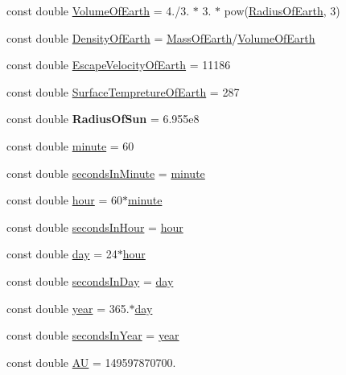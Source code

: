 \begin{DoxyCompactItemize}
\item 
const double \hyperlink{namespace_e_g_x_phys_a73aaaddeacf5d59643ec5e4a53a1a251}{Volume\+Of\+Earth} = 4./3. $\ast$ 3. $\ast$ pow(\hyperlink{namespace_e_g_x_phys_a11a2d4a914eb43c4095e225358293a45}{Radius\+Of\+Earth}, 3)
\item 
const double \hyperlink{namespace_e_g_x_phys_a2a671e37351b9b7e334385a26a7f7102}{Density\+Of\+Earth} = \hyperlink{namespace_e_g_x_phys_ace4a9d8c0b21215536857f4c1087a4e8}{Mass\+Of\+Earth}/\hyperlink{namespace_e_g_x_phys_a73aaaddeacf5d59643ec5e4a53a1a251}{Volume\+Of\+Earth}
\item 
const double \hyperlink{namespace_e_g_x_phys_a6a8cb7abae15a2f1bbcfd6623f72316c}{Escape\+Velocity\+Of\+Earth} = 11186
\item 
const double \hyperlink{namespace_e_g_x_phys_a942ce2ac76b5df8b08ec7827d3e20b76}{Surface\+Tempreture\+Of\+Earth} = 287
\item 
\mbox{\label{namespace_e_g_x_phys_a983b842cceb4a584787874fc9486384d}} 
const double {\bfseries Radius\+Of\+Sun} = 6.\+955e8
\item 
const double \hyperlink{namespace_e_g_x_phys_ab3a72a63e9c502847d0db88a167dc02b}{minute} = 60
\item 
const double \hyperlink{namespace_e_g_x_phys_a65038e0b58235dc59a44cec16638df35}{seconds\+In\+Minute} = \hyperlink{namespace_e_g_x_phys_ab3a72a63e9c502847d0db88a167dc02b}{minute}
\item 
const double \hyperlink{namespace_e_g_x_phys_a85c64ea70cddbb7e4c96adcc01cef6e2}{hour} = 60$\ast$\hyperlink{namespace_e_g_x_phys_ab3a72a63e9c502847d0db88a167dc02b}{minute}
\item 
const double \hyperlink{namespace_e_g_x_phys_a9a6a4eb13636aa068a3f1e41cde4d6fd}{seconds\+In\+Hour} = \hyperlink{namespace_e_g_x_phys_a85c64ea70cddbb7e4c96adcc01cef6e2}{hour}
\item 
const double \hyperlink{namespace_e_g_x_phys_a24d985ae6f6cefe7e25ac40806b88f79}{day} = 24$\ast$\hyperlink{namespace_e_g_x_phys_a85c64ea70cddbb7e4c96adcc01cef6e2}{hour}
\item 
const double \hyperlink{namespace_e_g_x_phys_ab4f86327f64403b843077ecc189ce52b}{seconds\+In\+Day} = \hyperlink{namespace_e_g_x_phys_a24d985ae6f6cefe7e25ac40806b88f79}{day}
\item 
const double \hyperlink{namespace_e_g_x_phys_afee9eebc1da4a1db2198fe0c45bcb53f}{year} = 365.$\ast$\hyperlink{namespace_e_g_x_phys_a24d985ae6f6cefe7e25ac40806b88f79}{day}
\item 
const double \hyperlink{namespace_e_g_x_phys_aac13efe8296819409bde4a0a8691d56a}{seconds\+In\+Year} = \hyperlink{namespace_e_g_x_phys_afee9eebc1da4a1db2198fe0c45bcb53f}{year}
\item 
const double \hyperlink{namespace_e_g_x_phys_a999332303a2214425184fbe23dbae0c5}{AU} = 149597870700.
\end{DoxyCompactItemize}


